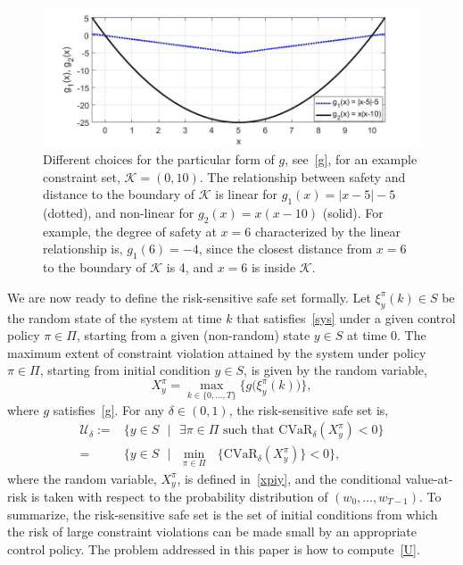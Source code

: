 \documentclass[letterpaper, 10 pt, conference]{ieeeconf}  %
\begin{document}
\begin{figure}[thpb]
      \centering
      \includegraphics[scale=0.25]{examples_of_g.jpg}
      \caption{Different choices for the particular form of $g$, see~\eqref{g}, for an example constraint set, $\mathcal{K} = (0, 10)$. The relationship between
		safety and distance to the boundary of $\mathcal{K}$ is linear for $g_1(x) = |x-5|-5$ (dotted), and non-linear for $g_2(x) = x(x-10)$ (solid).
		For example, the degree of safety at $x=6$ characterized by the linear relationship is, $g_1(6) = -4$, since the closest distance 
		from $x=6$ to the boundary of $\mathcal{K}$ is 4, and $x=6$ is inside $\mathcal{K}$.}
      \label{exg}
\end{figure}

We are now ready to define the risk-sensitive safe set formally.
Let $\xi_y^\pi(k) \in S$ be the random state of the system at time $k$ that satisfies~\eqref{sys} under a given control policy $\pi \in \Pi$,
starting from a given (non-random) state $y \in S$ at time 0.  
The maximum extent of constraint violation attained by the system under policy $\pi \in \Pi$, starting from initial condition $y \in S$, 
is given by the random variable,
\begin{equation}
X_y^\pi = {\underset{k \in \{0, \dots, T\}}\max} \Big\{ g\big(\xi_y^\pi(k)\big) \Big\},
\label{xpiy}\end{equation}
where $g$ satisfies~\eqref{g}.
For any $\delta \in (0,1)$, the risk-sensitive safe set is,
\begin{equation} \begin{aligned}
\mathcal{U}_\delta := &  \Big\{y \in S\text{ }|\text{ }\exists \pi \in \Pi \text{ such that } \text{CVaR}_\delta\left(X_y^\pi\right) < 0 \Big\} \\
= & \Big\{y \in S \text{ }|\text{ } {\underset{\pi \in \Pi}\min}\text{ } \big\{\text{CVaR}_\delta\left(X_y^\pi\right)\big\} < 0 \Big\},
\label{U}\end{aligned}\end{equation}
where the random variable, $X_y^\pi$, is defined in~\eqref{xpiy},
and the conditional value-at-risk is taken with respect to the probability distribution of $(w_0, \dots, w_{T-1})$. 
To summarize, the risk-sensitive safe set is the set of initial conditions from which
the risk of large constraint violations can be made small by an appropriate control policy.
The problem addressed in this paper is how to compute~\eqref{U}.
\end{document}
